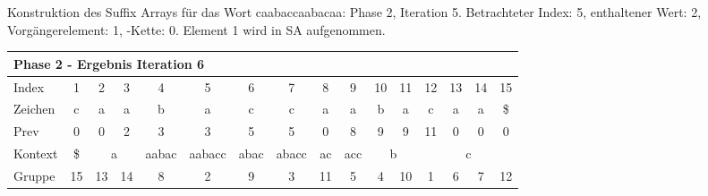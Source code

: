 \begin{table}[H]
\caption[Konstruktion des Suffix Arrays für das Wort caabaccaabacaa: Phase 2, Iteration 5]{Konstruktion des Suffix Arrays für das Wort caabaccaabacaa: Phase 2, Iteration 5. Betrachteter Index: 5, enthaltener Wert: 2, Vorgängerelement: 1, \prevpointer-Kette: 0. Element 1 wird in SA aufgenommen.}
\label{table_complex_example_2_5} 
\end{table}

\begin{table}[H]
\centering
\begin{adjustbox}{max width=\textwidth}
\centering
\begin{tabular}{lccccccccccccccc}
\multicolumn{16}{l}{Phase 2 - Ergebnis Iteration 6}                                                                                                                                                                                                                                                                                        \\ \hline
\multicolumn{1}{l|}{Index}   & 1                       & 2  & 3                       & 4                          & 5                           & 6                                              & 7                          & 8                       & 9                        & 10 & 11                      & 12  & 13  & 14  & 15  \\
\multicolumn{1}{l|}{Zeichen} & c                       & a  & a                       & b                          & a                           & c                                              & c                          & a                       & a                        & b  & a                       & c   & a   & a   & \$  \\
\multicolumn{1}{l|}{Prev}    & 0                       & 0  & 2                       & 3                          & 3                           & 5                                              & 5                          & 0                       & 8                        & 9  & 9                       & 11  & 0   & 0   & 0   \\ \hline
\multicolumn{1}{l|}{Kontext} & \multicolumn{1}{c|}{\$} & \multicolumn{2}{c|}{a}       & \multicolumn{1}{c|}{aabac} & \multicolumn{1}{c|}{aabacc} & \multicolumn{1}{c|}{abac}                      & \multicolumn{1}{c|}{abacc} & \multicolumn{1}{c|}{ac} & \multicolumn{1}{c|}{acc} & \multicolumn{2}{c|}{b}       & \multicolumn{4}{c}{c} \\
\multicolumn{1}{l|}{Gruppe}  & \multicolumn{1}{c|}{15} & 13 & \multicolumn{1}{c|}{14} & \multicolumn{1}{c|}{8}     & \multicolumn{1}{c|}{2}      & \multicolumn{1}{c|}{9}                         & \multicolumn{1}{c|}{3}     & \multicolumn{1}{c|}{11} & \multicolumn{1}{c|}{5}   & 4  & \multicolumn{1}{c|}{10} & 1   & 6   & 7   & 12  \\

\end{tabular}
\end{adjustbox}
\end{table}
